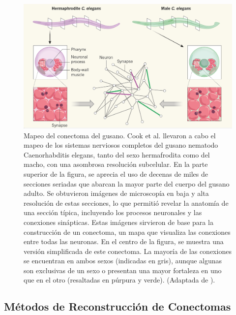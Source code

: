  

 
 
 
 

\begin{figure}[h!]
	\centering\includegraphics[width=\imsize]{conectoma.png}
	\caption[Mapeo del conectoma  del gusano.  ]{ Mapeo del conectoma  del gusano.  Cook et al. \protect\cite{cook_whole-animal_2019}  llevaron a cabo el mapeo de los sistemas nerviosos completos del gusano nematodo Caenorhabditis elegans, tanto del sexo hermafrodita como del macho, con una asombrosa resolución subcelular.   En la parte superior de la figura, se aprecia el uso de decenas de miles de secciones seriadas que abarcan la mayor parte del cuerpo del gusano adulto. Se obtuvieron imágenes de microscopía en baja y alta resolución de estas secciones, lo que permitió revelar la anatomía de una sección típica, incluyendo los procesos neuronales y las conexiones sinápticas. Estas imágenes sirvieron de base para la construcción de un conectoma, un mapa que visualiza las conexiones entre todas las neuronas. En el centro de la figura, se muestra una versión simplificada de este conectoma. La mayoría de las conexiones se encuentran en ambos sexos (indicadas en gris), aunque algunas son exclusivas de un sexo o presentan una mayor fortaleza en uno que en el otro (resaltadas en púrpura y verde).   (Adaptada de \protect\cite{portman_neural_2019}).}\label{fig:conectoma}
\end{figure}


\subsection{Métodos de Reconstrucción de Conectomas}

